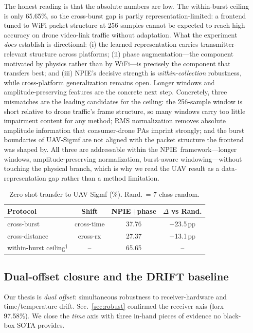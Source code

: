 \documentclass[journal]{IEEEtran}
\newcommand{\npie}{\textsc{NPIE}}
\begin{document}
The honest reading is that the absolute numbers are low. The within-burst ceiling is only 65.65\%, so the cross-burst gap is partly representation-limited: a frontend tuned to WiFi packet structure at 256 samples cannot be expected to reach high accuracy on drone video-link traffic without adaptation. What the experiment \emph{does} establish is directional: (i) the learned representation carries transmitter-relevant structure across platforms; (ii) phase augmentation---the component motivated by physics rather than by WiFi---is precisely the component that transfers best; and (iii) \npie's decisive strength is \emph{within-collection} robustness, while cross-platform generalization remains open. Longer windows and amplitude-preserving features are the concrete next step. Concretely, three mismatches are the leading candidates for the ceiling: the 256-sample window is short relative to drone traffic's frame structure, so many windows carry too little impairment content for any method; RMS normalization removes absolute amplitude information that consumer-drone PAs imprint strongly; and the burst boundaries of UAV-Sigmf are not aligned with the packet structure the frontend was shaped by. All three are addressable within the \npie\ framework---longer windows, amplitude-preserving normalization, burst-aware windowing---without touching the physical branch, which is why we read the UAV result as a data-representation gap rather than a method limitation.

\begin{table}[t]
\centering
\footnotesize
\caption{Zero-shot transfer to UAV-Sigmf (\%). Rand.\ = 7-class random.}
\label{tab:uav}
\begin{tabular}{@{}lccc@{}}
\toprule
Protocol & Shift & NPIE+phase & $\Delta$ vs Rand. \\
\midrule
cross-burst & cross-time & 37.76 & +23.5\,pp \\
cross-distance & cross-rx & 27.37 & +13.1\,pp \\
within-burst ceiling$^\dagger$ & -- & 65.65 & -- \\
\bottomrule
\end{tabular}
\end{table}

\subsection{Dual-offset closure and the DRIFT baseline}
\label{sec:closure}
Our thesis is \emph{dual offset}: simultaneous robustness to receiver-hardware and time/temperature drift. Sec.~\ref{sec:robust} confirmed the receiver axis (lorx 97.58\%). We close the \emph{time} axis with three in-hand pieces of evidence no black-box SOTA provides.
\end{document}
